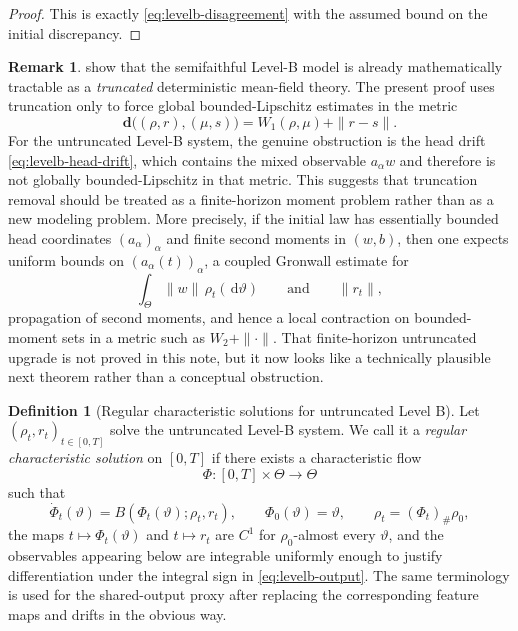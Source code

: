 \documentclass[11pt]{article}
\theoremstyle{definition}
\newtheorem{definition}[theorem]{Definition}
\newtheorem{remark}[theorem]{Remark}
\newcommand{\W}{W_1}
\newcommand{\dd}{\,\mathrm{d}}
\begin{document}
\begin{proof}
This is exactly \cref{eq:levelb-disagreement} with the assumed bound on the initial discrepancy.
\end{proof}

\begin{remark}
show that the semifaithful Level-B model is already mathematically tractable as a \emph{truncated} deterministic mean-field theory.
The present proof uses truncation only to force global bounded-Lipschitz estimates in the metric
\[
  \mathbf d\bigl((\rho,r),(\mu,s)\bigr)=\W(\rho,\mu)+\|r-s\|.
\]
For the untruncated Level-B system, the genuine obstruction is the head drift \cref{eq:levelb-head-drift},
which contains the mixed observable $a_\alpha w$ and therefore is not globally bounded-Lipschitz in that metric.
This suggests that truncation removal should be treated as a finite-horizon moment problem rather than as a new modeling problem.
More precisely, if the initial law has essentially bounded head coordinates $(a_\alpha)_\alpha$ and finite second moments in $(w,b)$,
then one expects uniform bounds on $(a_\alpha(t))_\alpha$, a coupled Gronwall estimate for
\[
  \int_\Theta \|w\|\,\rho_t(\dd \vartheta)
  \qquad \text{and} \qquad
  \|r_t\|,
\]
propagation of second moments, and hence a local contraction on bounded-moment sets in a metric such as $W_2+\|\cdot\|$.
That finite-horizon untruncated upgrade is not proved in this note,
but it now looks like a technically plausible next theorem rather than a conceptual obstruction.
\end{remark}

\begin{definition}[Regular characteristic solutions for untruncated Level B]
\label{def:levelb-regular-characteristic}
Let $(\rho_t,r_t)_{t\in[0,T]}$ solve the untruncated Level-B system.
We call it a \emph{regular characteristic solution} on $[0,T]$ if there exists a characteristic flow
\[
  \Phi:[0,T]\times\Theta\to\Theta
\]
such that
\[
  \dot \Phi_t(\vartheta)=B(\Phi_t(\vartheta);\rho_t,r_t),
  \qquad
  \Phi_0(\vartheta)=\vartheta,
  \qquad
  \rho_t=(\Phi_t)_\#\rho_0,
\]
the maps $t\mapsto \Phi_t(\vartheta)$ and $t\mapsto r_t$ are $C^1$ for $\rho_0$-almost every $\vartheta$,
and the observables appearing below are integrable uniformly enough to justify differentiation under the integral sign in \eqref{eq:levelb-output}.
The same terminology is used for the shared-output proxy after replacing the corresponding feature maps and drifts in the obvious way.
\end{definition}
\end{document}
